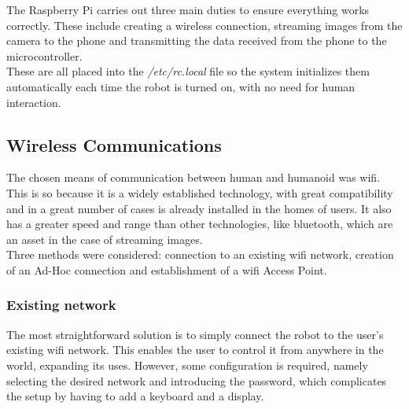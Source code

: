 The Raspberry Pi carries out three main duties to ensure everything works correctly. These include creating a wireless connection, streaming images from the camera to the phone and transmitting the data received from the phone to the microcontroller.\\

 These are all placed into the \textit{/etc/rc.local} file so the system initializes them automatically each time the robot is turned on, with no need for human interaction.








\subsection{Wireless Communications}%

The chosen means of communication between human and humanoid was wifi. This is so because it is a widely established technology, with great compatibility and in a great number of cases is already installed in the homes of users. It also has a greater speed and range than other technologies, like bluetooth, which are an asset in the case of streaming images.\\

Three methods were considered: connection to an existing wifi network, creation of an Ad-Hoc connection and establishment of a wifi Access Point.










\subsubsection{Existing network}

The most straightforward solution is to simply connect the robot to the user's existing wifi network. This enables the user to control it from anywhere in the world, expanding its uses. However, some configuration is required, namely selecting the desired network and introducing the password, which complicates the setup by having to add a keyboard and a display.\\

